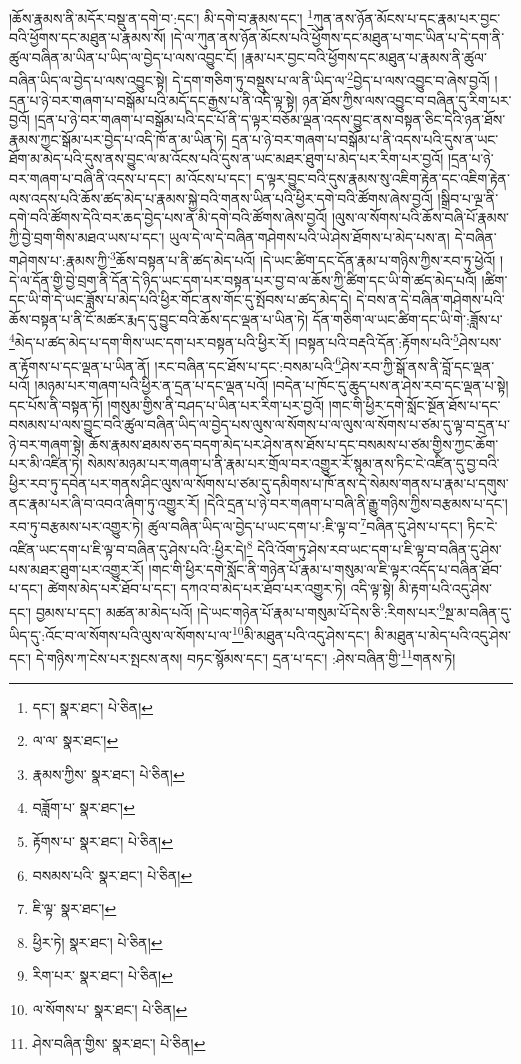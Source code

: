 །ཆོས་རྣམས་ནི་མདོར་བསྡུ་ན་དགེ་བ་:དང་། མི་དགེ་བ་རྣམས་དང་། \footnote{དང་།    སྣར་ཐང་།  པེ་ཅིན། }ཀུན་ནས་ཉོན་མོངས་པ་དང་རྣམ་པར་བྱང་བའི་ཕྱོགས་དང་མཐུན་པ་རྣམས་སོ། །དེ་ལ་ཀུན་ནས་ཉོན་མོངས་པའི་ཕྱོགས་དང་མཐུན་པ་གང་ཡིན་པ་དེ་དག་ནི་ཚུལ་བཞིན་མ་ཡིན་པ་ཡིད་ལ་བྱེད་པ་ལས་འབྱུང་ངོ། །རྣམ་པར་བྱང་བའི་ཕྱོགས་དང་མཐུན་པ་རྣམས་ནི་ཚུལ་བཞིན་ཡིད་ལ་བྱེད་པ་ལས་འབྱུང་སྟེ། དེ་དག་གཅིག་ཏུ་བསྡུས་པ་ལ་ནི་ཡིད་ལ་\footnote{ལ་ལ་  སྣར་ཐང་། }བྱེད་པ་ལས་འབྱུང་བ་ཞེས་བྱའོ། །དྲན་པ་ཉེ་བར་གཞག་པ་བསྒོམ་པའི་མདོ་དང་རྒྱས་པ་ནི་འདི་ལྟ་སྟེ། ཉན་ཐོས་ཀྱིས་ལས་འབྱུང་བ་བཞིན་དུ་རིག་པར་བྱའོ། །དྲན་པ་ཉེ་བར་གཞག་པ་བསྒོམ་པའི་དང་པོ་ནི་ད་ལྟར་བཅོམ་ལྡན་འདས་བྱུང་ནས་བསྟན་ཅིང་དེའི་ཉན་ཐོས་རྣམས་ཀྱང་སྒོམ་པར་བྱེད་པ་འདི་ཁོ་ན་མ་ཡིན་ཏེ། དྲན་པ་ཉེ་བར་གཞག་པ་བསྒོམ་པ་ནི་འདས་པའི་དུས་ན་ཡང་ཐོག་མ་མེད་པའི་དུས་ནས་བྱུང་ལ་མ་འོངས་པའི་དུས་ན་ཡང་མཐར་ཐུག་པ་མེད་པར་རིག་པར་བྱའོ། །དྲན་པ་ཉེ་བར་གཞག་པ་བཞི་ནི་འདས་པ་དང་། མ་འོངས་པ་དང་། ད་ལྟར་བྱུང་བའི་དུས་རྣམས་སུ་འཇིག་རྟེན་དང་འཇིག་རྟེན་ལས་འདས་པའི་ཆོས་ཚད་མེད་པ་རྣམས་སྐྱེ་བའི་གནས་ཡིན་པའི་ཕྱིར་དགེ་བའི་ཚོགས་ཞེས་བྱའོ། །སྒྲིབ་པ་ལྔ་ནི་དགེ་བའི་ཚོགས་དེའི་བར་ཆད་བྱེད་པས་ན་མི་དགེ་བའི་ཚོགས་ཞེས་བྱའོ། །ལུས་ལ་སོགས་པའི་ཆོས་བཞི་པོ་རྣམས་ཀྱི་བྱེ་བྲག་གིས་མཐའ་ཡས་པ་དང་། ཡུལ་དེ་ལ་དེ་བཞིན་གཤེགས་པའི་ཡེ་ཤེས་ཐོགས་པ་མེད་པས་ན། དེ་བཞིན་གཤེགས་པ་:རྣམས་ཀྱི་\footnote{རྣམས་ཀྱིས་  སྣར་ཐང་།  པེ་ཅིན། }ཆོས་བསྟན་པ་ནི་ཚད་མེད་པའོ། །དེ་ཡང་ཚིག་དང་དོན་རྣམ་པ་གཉིས་ཀྱིས་རབ་ཏུ་ཕྱེའོ། །དེ་ལ་དོན་གྱི་བྱེ་བྲག་ནི་དོན་དེ་ཉིད་ཡང་དག་པར་བསྟན་པར་བྱ་བ་ལ་ཆོས་ཀྱི་ཚིག་དང་ཡི་གེ་ཚད་མེད་པའོ། །ཚིག་དང་ཡི་གེ་དེ་ཡང་ཟློས་པ་མེད་པའི་ཕྱིར་གོང་ནས་གོང་དུ་སྤོབས་པ་ཚད་མེད་དེ། དེ་བས་ན་དེ་བཞིན་གཤེགས་པའི་ཆོས་བསྟན་པ་ནི་ངོ་མཚར་རྨད་དུ་བྱུང་བའི་ཆོས་དང་ལྡན་པ་ཡིན་ཏེ། དོན་གཅིག་ལ་ཡང་ཚིག་དང་ཡི་གེ་:ཟློས་པ་\footnote{བཟློག་པ་  སྣར་ཐང་། }མེད་པ་ཚད་མེད་པ་དག་གིས་ཡང་དག་པར་བསྟན་པའི་ཕྱིར་རོ། །བསྟན་པའི་བརྡའི་དོན་:རྟོགས་པའི་\footnote{རྟོགས་པ་  སྣར་ཐང་།  པེ་ཅིན། }ཤེས་པས་ན་རྟོགས་པ་དང་ལྡན་པ་ཡིན་ནོ། །རང་བཞིན་དང་ཐོས་པ་དང་:བསམ་པའི་\footnote{བསམས་པའི་  སྣར་ཐང་།  པེ་ཅིན། }ཤེས་རབ་ཀྱི་སྒོ་ནས་ནི་བློ་དང་ལྡན་པའོ། །མཉམ་པར་གཞག་པའི་ཕྱིར་ན་དྲན་པ་དང་ལྡན་པའོ། །བདེན་པ་ཁོང་དུ་ཆུད་པས་ན་ཤེས་རབ་དང་ལྡན་པ་སྟེ། དང་པོས་ནི་བསྟན་ཏོ། །གསུམ་གྱིས་ནི་བཤད་པ་ཡིན་པར་རིག་པར་བྱའོ། །གང་གི་ཕྱིར་དགེ་སློང་སྔོན་ཐོས་པ་དང་བསམས་པ་ལས་བྱུང་བའི་ཚུལ་བཞིན་ཡིད་ལ་བྱེད་པས་ལུས་ལ་སོགས་པ་ལ་ལུས་ལ་སོགས་པ་ཙམ་དུ་ལྟ་བ་དྲན་པ་ཉེ་བར་གཞག་སྟེ། ཆོས་རྣམས་ཐམས་ཅད་བདག་མེད་པར་ཤེས་ནས་ཐོས་པ་དང་བསམས་པ་ཙམ་གྱིས་ཀྱང་ཆོག་པར་མི་འཛིན་ཏེ། སེམས་མཉམ་པར་གཞག་པ་ནི་རྣམ་པར་གྲོལ་བར་འགྱུར་རོ་སྙམ་ནས་ཏིང་ངེ་འཛིན་དུ་བྱ་བའི་ཕྱིར་རབ་ཏུ་དབེན་པར་གནས་ཤིང་ལུས་ལ་སོགས་པ་ཙམ་དུ་དམིགས་པ་ཁོ་ནས་དེ་སེམས་གནས་པ་རྣམ་པ་དགུས་ནང་རྣམ་པར་ཞི་བ་འབའ་ཞིག་ཏུ་འགྱུར་རོ། །དེའི་དྲན་པ་ཉེ་བར་གཞག་པ་བཞི་ནི་རྒྱུ་གཉིས་ཀྱིས་བརྩམས་པ་དང་། རབ་ཏུ་བརྩམས་པར་འགྱུར་ཏེ། ཚུལ་བཞིན་ཡིད་ལ་བྱེད་པ་ཡང་དག་པ་:ཇི་ལྟ་བ་\footnote{ཇི་ལྟ་  སྣར་ཐང་། }བཞིན་དུ་ཤེས་པ་དང་། ཏིང་ངེ་འཛིན་ཡང་དག་པ་ཇི་ལྟ་བ་བཞིན་དུ་ཤེས་པའི་:ཕྱིར་དེ།\footnote{ཕྱིར་ཏེ།  སྣར་ཐང་།  པེ་ཅིན། } དེའི་འོག་ཏུ་ཤེས་རབ་ཡང་དག་པ་ཇི་ལྟ་བ་བཞིན་དུ་ཤེས་པས་མཐར་ཐུག་པར་འགྱུར་རོ། །གང་གི་ཕྱིར་དགེ་སློང་ནི་གཉེན་པོ་རྣམ་པ་གསུམ་ལ་ཇི་ལྟར་འདོད་པ་བཞིན་ཐོབ་པ་དང་། ཚེགས་མེད་པར་ཐོབ་པ་དང་། དཀའ་བ་མེད་པར་ཐོབ་པར་འགྱུར་ཏེ། འདི་ལྟ་སྟེ། མི་རྟག་པའི་འདུ་ཤེས་དང་། བྱམས་པ་དང་། མཚན་མ་མེད་པའོ། །དེ་ཡང་གཉེན་པོ་རྣམ་པ་གསུམ་པོ་དེས་ཅི་:རིགས་པར་\footnote{རིག་པར་  སྣར་ཐང་།  པེ་ཅིན། }སྔ་མ་བཞིན་དུ་ཡིད་དུ་:འོང་བ་ལ་སོགས་པའི་ལུས་ལ་སོགས་པ་ལ་\footnote{ལ་སོགས་པ་  སྣར་ཐང་།  པེ་ཅིན། }མི་མཐུན་པའི་འདུ་ཤེས་དང་། མི་མཐུན་པ་མེད་པའི་འདུ་ཤེས་དང་། དེ་གཉིས་ཀ་ངེས་པར་སྤངས་ནས། བཏང་སྙོམས་དང་། དྲན་པ་དང་། :ཤེས་བཞིན་གྱི་\footnote{ཤེས་བཞིན་གྱིས་  སྣར་ཐང་།  པེ་ཅིན། }གནས་ཏེ། 